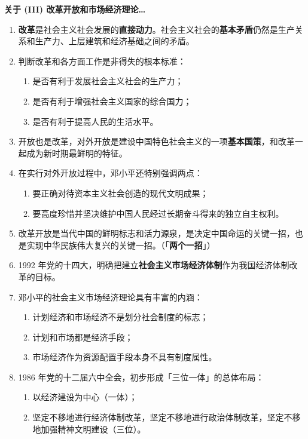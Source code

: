 \documentclass[UTF8]{ctexart}
\newcommand\Emph[2]{\colorbox{c#1-light}{\textcolor{c#1-emph}{\textbf{#2}}}}
\begin{document}
\begin{mybox}{6}
\textbf{关于 (III) 改革开放和市场经济理论…}
\begin{enumerate}[start=18]
  \item \Emph{6}{改革}是社会主义社会发展的\Emph{6}{直接动力}。社会主义社会的\Emph{6}{基本矛盾}仍然是生产关系和生产力、上层建筑和经济基础之间的矛盾。
  \item 判断改革和各方面工作是非得失的根本标准：
  \begin{enumerate}[label={\roman{enumii})}, start=1]
    \item 是否有利于发展社会主义社会的生产力；
    \item 是否有利于增强社会主义国家的综合国力；
    \item 是否有利于提高人民的生活水平。
  \end{enumerate}
  \item 开放也是改革，对外开放是建设中国特色社会主义的一项\Emph{6}{基本国策}，和改革一起成为新时期最鲜明的特征。
  \item 在实行对外开放过程中，邓小平还特别强调两点：
  \begin{enumerate}[label={\roman{enumii})}, start=1]
    \item 要正确对待资本主义社会创造的现代文明成果；
    \item 要高度珍惜并坚决维护中国人民经过长期奋斗得来的独立自主权利。
  \end{enumerate}
  \item 改革开放是当代中国的鲜明标志和活力源泉，是决定中国命运的关键一招，也是实现中华民族伟大复兴的关键一招。（「\Emph{6}{两个一招}」）
  \item 1992 年党的十四大，明确把建立\Emph{6}{社会主义市场经济体制}作为我国经济体制改革的目标。
  \item 邓小平的社会主义市场经济理论具有丰富的内涵：
  \begin{enumerate}[label={\roman{enumii})}, start=1]
    \item 计划经济和市场经济不是划分社会制度的标志；
    \item 计划和市场都是经济手段；
    \item 市场经济作为资源配置手段本身不具有制度属性。
  \end{enumerate}
  \item 1986 年党的十二届六中全会，初步形成「三位一体」的总体布局：
  \begin{enumerate}[label={\roman{enumii})}, start=1]
    \item 以经济建设为中心（一体）；
    \item 坚定不移地进行经济体制改革，坚定不移地进行政治体制改革，坚定不移地加强精神文明建设（三位）。
  \end{enumerate}
\end{enumerate}
\end{mybox}
\end{document}
